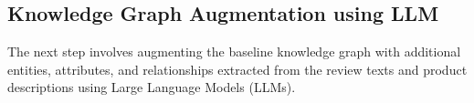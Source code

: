 \documentclass{article}
\begin{document}
\subsection{Knowledge Graph Augmentation using LLM}
The next step involves augmenting the baseline knowledge graph with additional
entities, attributes, and relationships extracted from the review texts and
product descriptions using Large Language Models (LLMs).


\end{document}
